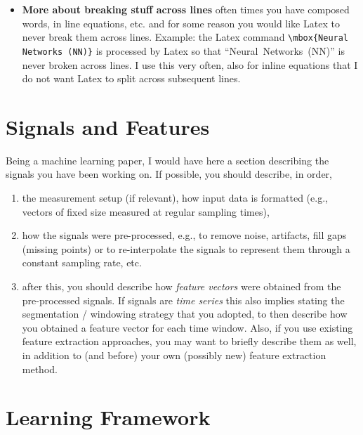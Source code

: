 {\begin{itemize}
\item \textbf{More about breaking stuff across lines} often times you have composed words, in line equations, etc. and for some reason you would like Latex to never break them across lines. Example: the Latex command \texttt{\textbackslash mbox\{Neural Networks (NN)\}} is processed by Latex so that ``\mbox{Neural Networks (NN)}'' is never broken across lines. I use this very often, also for inline equations that I do not want Latex to split across subsequent lines.
\end{itemize}
}


\section{Signals and Features}
\label{sec:model}

Being a machine learning paper, I would have here a section describing the signals you have been working on. If possible, you should describe, in order, 
\begin{enumerate}
\item the measurement setup (if relevant), how input data is formatted (e.g., vectors of fixed size measured at regular sampling times), 
\item how the signals were \mbox{pre-processed}, e.g., to remove noise, artifacts, fill gaps (missing points) or to re-interpolate the signals to represent them through a constant sampling rate, etc.
\item after this, you should describe how {\it feature vectors} were obtained from the \mbox{pre-processed} signals. If signals are {\it time series} this also implies stating the segmentation / windowing strategy that you adopted, to then describe how you obtained a feature vector for each time window. Also, if you use existing feature extraction approaches, you may want to briefly describe them as well, in addition to (and before) your own (possibly new) feature extraction method.
\end{enumerate}


\section{Learning Framework}
\label{sec:learning_framework}


